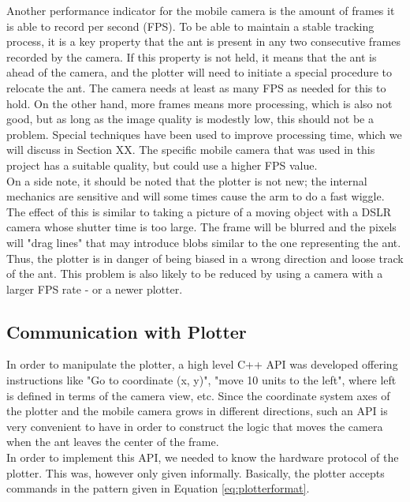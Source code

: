 Another performance indicator for the mobile camera is the amount of frames it is able to record per second (FPS). To be able to maintain a stable tracking process, it is a key property that the ant is present in any two consecutive frames recorded by the camera. If this property is not held, it means that the ant is ahead of the camera, and the plotter will need to initiate a special procedure to relocate the ant. The camera needs at least as many FPS as needed for this to hold. On the other hand, more frames means more processing, which is also not good, but as long as the image quality is modestly low, this should not be a problem. Special techniques have been used to improve processing time, which we will discuss in Section XX. The specific mobile camera that was used in this project has a suitable quality, but could use a higher FPS value. \\

On a side note, it should be noted that the plotter is not new; the internal mechanics are sensitive and will some times cause the arm to do a fast wiggle. The effect of this is similar to taking a picture of a moving object with a DSLR camera whose shutter time is too large. The frame will be blurred and the pixels will "drag lines" that may introduce blobs similar to the one representing the ant. Thus, the plotter is in danger of being biased in a wrong direction and loose track of the ant. This problem is also likely to be reduced by using a camera with a larger FPS rate - or a newer plotter. \\

\subsection{Communication with Plotter}
In order to manipulate the plotter, a high level C++ API was developed offering instructions like "Go to coordinate (x, y)", "move 10 units to the left", where left is defined in terms of the camera view, etc. Since the coordinate system axes of the plotter and the mobile camera grows in different directions, such an API is very convenient to have in order to construct the logic that moves the camera when the ant leaves the center of the frame. \\

In order to implement this API, we needed to know the hardware protocol of the plotter. This was, however only given informally. Basically, the plotter accepts commands in the pattern given in Equation \ref{eq:plotterformat}.

